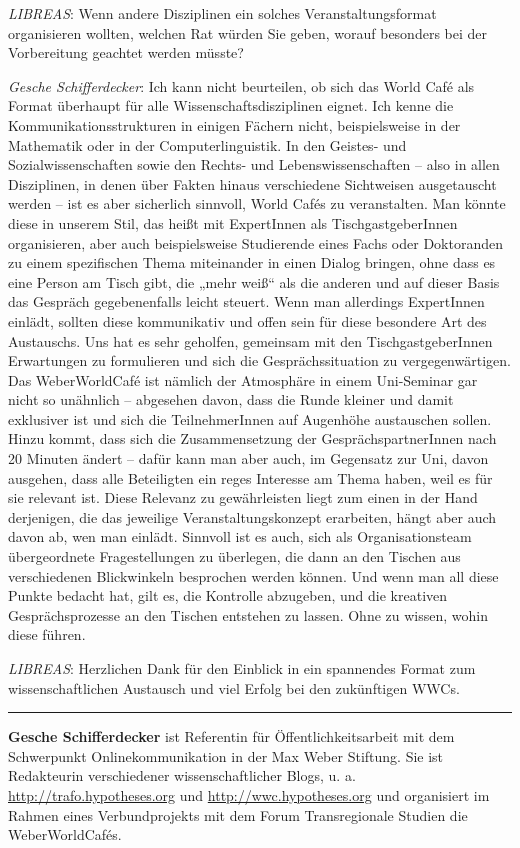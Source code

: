 \documentclass[a4paper,
fontsize=11pt,
oneside,
numbers=noperiodatend,
parskip=half-,
bibliography=totoc,
final
]{scrartcl}
\begin{document}
\emph{LIBREAS}: Wenn andere Disziplinen ein solches Veranstaltungsformat
organisieren wollten, welchen Rat würden Sie geben, worauf besonders bei
der Vorbereitung geachtet werden müsste?

\emph{Gesche Schifferdecker}: Ich kann nicht beurteilen, ob sich das
World Café als Format überhaupt für alle Wissenschaftsdisziplinen
eignet. Ich kenne die Kommunikationsstrukturen in einigen Fächern nicht,
beispielsweise in der Mathematik oder in der Computerlinguistik. In den
Geistes- und Sozialwissenschaften sowie den Rechts- und
Lebenswissenschaften -- also in allen Disziplinen, in denen über Fakten
hinaus verschiedene Sichtweisen ausgetauscht werden -- ist es aber
sicherlich sinnvoll, World Cafés zu veranstalten. Man könnte diese in
unserem Stil, das heißt mit ExpertInnen als TischgastgeberInnen
organisieren, aber auch beispielsweise Studierende eines Fachs oder
Doktoranden zu einem spezifischen Thema miteinander in einen Dialog
bringen, ohne dass es eine Person am Tisch gibt, die „mehr weiß`` als
die anderen und auf dieser Basis das Gespräch gegebenenfalls leicht
steuert. Wenn man allerdings ExpertInnen einlädt, sollten diese
kommunikativ und offen sein für diese besondere Art des Austauschs. Uns
hat es sehr geholfen, gemeinsam mit den TischgastgeberInnen Erwartungen
zu formulieren und sich die Gesprächssituation zu vergegenwärtigen. Das
WeberWorldCafé ist nämlich der Atmosphäre in einem Uni-Seminar gar nicht
so unähnlich -- abgesehen davon, dass die Runde kleiner und damit
exklusiver ist und sich die TeilnehmerInnen auf Augenhöhe austauschen
sollen. Hinzu kommt, dass sich die Zusammensetzung der
GesprächspartnerInnen nach 20 Minuten ändert -- dafür kann man aber
auch, im Gegensatz zur Uni, davon ausgehen, dass alle Beteiligten ein
reges Interesse am Thema haben, weil es für sie relevant ist. Diese
Relevanz zu gewährleisten liegt zum einen in der Hand derjenigen, die
das jeweilige Veranstaltungskonzept erarbeiten, hängt aber auch davon
ab, wen man einlädt. Sinnvoll ist es auch, sich als Organisationsteam
übergeordnete Fragestellungen zu überlegen, die dann an den Tischen aus
verschiedenen Blickwinkeln besprochen werden können. Und wenn man all
diese Punkte bedacht hat, gilt es, die Kontrolle abzugeben, und die
kreativen Gesprächsprozesse an den Tischen entstehen zu lassen. Ohne zu
wissen, wohin diese führen.

\emph{LIBREAS}: Herzlichen Dank für den Einblick in ein spannendes
Format zum wissenschaftlichen Austausch und viel Erfolg bei den
zukünftigen WWCs.

\begin{center}\rule{0.5\linewidth}{\linethickness}\end{center}

\textbf{Gesche Schifferdecker} ist Referentin für Öffentlichkeitsarbeit
mit dem Schwerpunkt Onlinekommunikation in der Max Weber Stiftung. Sie
ist Redakteurin verschiedener wissenschaftlicher Blogs, u. a.
\url{http://trafo.hypotheses.org} und \url{http://wwc.hypotheses.org}
und organisiert im Rahmen eines Verbundprojekts mit dem Forum
Transregionale Studien die WeberWorldCafés.
\end{document}

